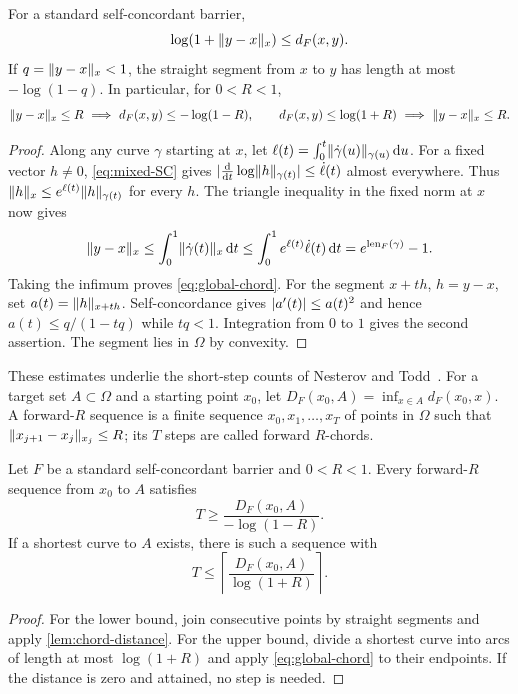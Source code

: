 \begin{lemma}
\label{lem:chord-distance}
For a standard self-concordant barrier,
\begin{equation}
 \log(1+\lVert y-x\rVert_x)\leq d_F(x,y).
 \label{eq:global-chord}
\end{equation}
If $q=\lVert y-x\rVert_x<1$, the straight segment from $x$ to $y$ has length
at most $-\log(1-q)$. In particular, for $0<R<1$,
\begin{equation}
 \norm{y-x}_x\leq R\ \Longrightarrow\ d_F(x,y)\leq-\log(1-R),
 \qquad
 d_F(x,y)\leq\log(1+R)\ \Longrightarrow\ \norm{y-x}_x\leq R.
 \label{eq:two-chord-bounds}
\end{equation}
\end{lemma}
\begin{proof}
Along any curve $\gamma$ starting at $x$, let
$\ell(t)=\int_0^t\lVert \dot\gamma(u)\rVert_{\gamma(u)}\,\mathrm d u$.
For a fixed vector $h\ne0$, \eqref{eq:mixed-SC} gives
$\lvert \frac{\mathrm d}{\mathrm dt}\log\lVert h\rVert_{\gamma(t)}\rvert
\leq\dot\ell(t)$ almost everywhere. Thus
$\lVert h\rVert_x\leq e^{\ell(t)}\lVert h\rVert_{\gamma(t)}$ for every $h$.
The triangle inequality in the fixed norm at $x$ now gives
\[
 \lVert y-x\rVert_x\leq\int_0^1\lVert \dot\gamma(t)\rVert_x\,\mathrm d t
 \leq\int_0^1e^{\ell(t)}\dot\ell(t)\,\mathrm d t=e^{\operatorname{len}_F(\gamma)}-1.
\]
Taking the infimum proves \eqref{eq:global-chord}.
For the segment $x+th$, $h=y-x$, set $a(t)=\lVert h\rVert_{x+th}$.
Self-concordance gives $\lvert a'(t)\rvert\leq a(t)^2$ and hence
$a(t)\leq q/(1-tq)$ while $tq<1$. Integration from $0$ to $1$ gives
the second assertion. The segment lies in $\Omega$ by convexity.
\end{proof}

These estimates underlie the short-step counts of Nesterov and
Todd~\cite[Section~3]{NesterovTodd2002}.
For a target set $A\subset\Omega$ and a starting point $x_0$, let
$D_F(x_0,A)=\inf_{x\in A}d_F(x_0,x)$.
A forward-$R$ sequence is a finite sequence $x_0,x_1,\ldots,x_T$ of
points in $\Omega$ such that $\lVert x_{j+1}-x_j\rVert_{x_j}\leq R$; its $T$
steps are called forward $R$-chords.

\begin{corollary}
\label{cor:optimal-movement}
Let $F$ be a standard self-concordant barrier and $0<R<1$.
Every forward-$R$ sequence from $x_0$ to $A$ satisfies
\begin{equation}
 T\geq\frac{D_F(x_0,A)}{-\log(1-R)}.
 \label{eq:movement-lower}
\end{equation}
If a shortest curve to $A$ exists, there is such a sequence with
\begin{equation}
 T\leq\left\lceil\frac{D_F(x_0,A)}{\log(1+R)}\right\rceil.
 \label{eq:movement-upper}
\end{equation}
\end{corollary}
\begin{proof}
For the lower bound, join consecutive points by straight segments and
apply \cref{lem:chord-distance}. For the upper bound, divide a shortest
curve into arcs of length at most $\log(1+R)$ and apply
\eqref{eq:global-chord} to their endpoints. If the distance is zero and
attained, no step is needed.
\end{proof}

